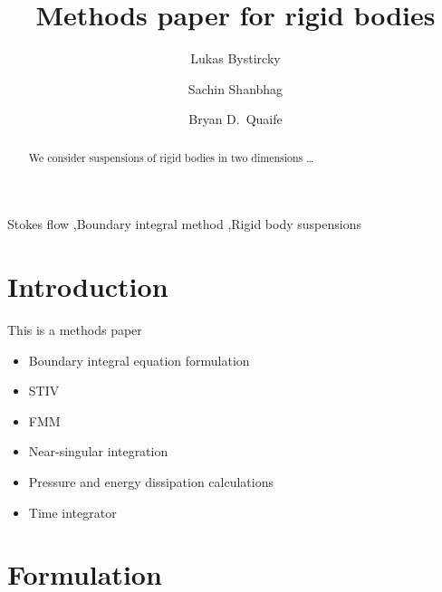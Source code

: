 \documentclass[preprint, 10pt]{elsarticle}
\begin{document}
\title{Methods paper for rigid bodies}

\author[Lukas]{Lukas Bystircky}
\author[Lukas]{Sachin Shanbhag}
\author[Bryan]{Bryan D.~Quaife}
\address[Lukas]{Department of Scientific Computing, Florida State University, Tallahassee, FL, 32306.}
\address[Bryan]{Department of Scientific Computing and Geophysical Fluid Dynamics Institute, Florida State University, Tallahassee, FL, 32306.}

\begin{abstract} 
We consider suspensions of rigid bodies in two dimensions \ldots
\end{abstract}

\begin{keyword}
  Stokes flow \sep Boundary integral method \sep Rigid body suspensions 
\end{keyword}

\maketitle





\section{Introduction\label{s:intro}}


This is a methods paper
\begin{itemize}
  \item Boundary integral equation formulation
  \item STIV
  \item FMM
  \item Near-singular integration
  \item Pressure and energy dissipation calculations
  \item Time integrator
\end{itemize}




\section{Formulation\label{s:formulation}} 
\end{document}
